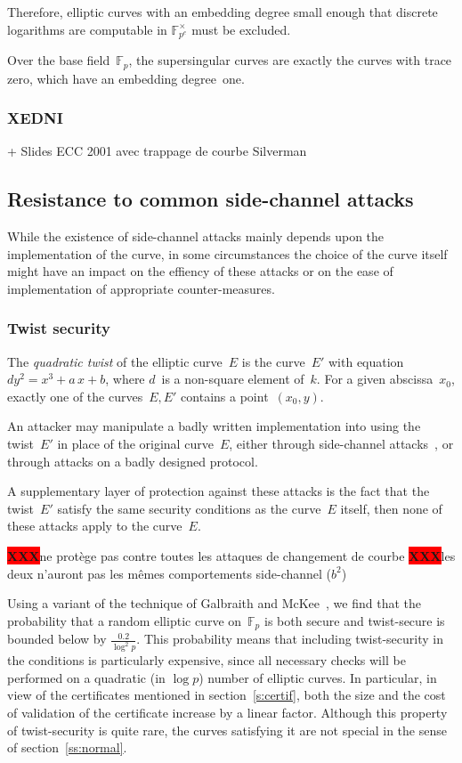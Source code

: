 \documentclass{article}
\def\F{\mathbb{F}}
\def\XXX{{\colorbox{red}{{\color{white}\bfseries XXX}}}}
\begin{document}
Therefore, elliptic curves with an embedding degree small enough
that discrete logarithms are computable in $\F_{p^e}^{×}$
must be excluded.

Over the base field~$\F_p$, the supersingular curves
are exactly the curves with trace zero,
which have an embedding degree~one.

\subsubsection{XEDNI}

+ Slides ECC 2001 avec trappage de courbe Silverman

\subsection{Resistance to common side-channel attacks}
\label{ss:side}

While the existence of side-channel attacks
mainly depends upon the implementation of the curve,
in some circumstances the choice of the curve itself
might have an impact on the effiency of these attacks
or on the ease of implementation of appropriate counter-measures.

\subsubsection{Twist security}
\label{sss:twist}

The \emph{quadratic twist} of the elliptic curve~$E$
is the curve~$E'$ with equation~$d y^2 = x^3 + a\,x + b$,
where $d$~is a non-square element of~$k$.
For a given abscissa~$x_0$,
exactly one of the curves~$E, E'$ contains a point~$(x_0, y)$.

An attacker may manipulate a badly written implementation
into using the twist~$E'$
in place of the original curve~$E$,
either through side-channel attacks~\cite{fdtc2008flrv},
or through attacks on a badly designed protocol.

A supplementary layer of protection against these attacks
is the fact that the twist~$E'$ satisfy
the same security conditions as the curve~$E$ itself, then
none of these attacks apply to the curve~$E$.

\XXX ne protège pas contre toutes les attaques de changement de courbe
\XXX les deux n'auront pas les mêmes comportements side-channel ($b^2$)

Using a variant of the technique of Galbraith and McKee~\cite{lms2000gm},
we find that the probability that a random elliptic curve on~$\F_p$
is both secure and twist-secure
is bounded below by $\frac{0.2}{\log^2 p}$.
This probability means that
including twist-security in the conditions is particularly expensive,
since all necessary checks will be performed on
a quadratic (in $\log p$) number of elliptic curves.
In particular, in view of
the certificates mentioned in section~\ref{s:certif},
both the size and the cost of validation of the certificate
increase by a linear factor.
Although this property of twist-security is quite rare,
the curves satisfying it are not special
in the sense of section~\ref{ss:normal}.
\end{document}
